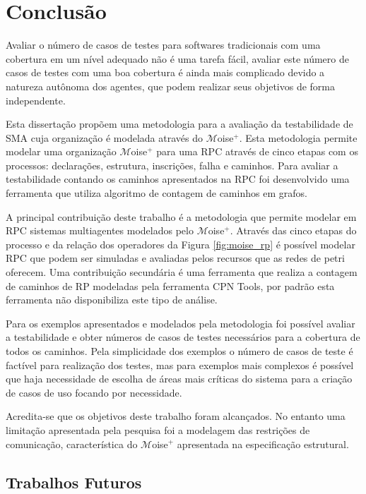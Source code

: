 \chapter{Conclusão}
Avaliar o número de casos de testes para softwares tradicionais com uma cobertura em um nível adequado não é uma tarefa fácil, avaliar este número de casos de testes com uma boa cobertura é ainda mais complicado devido a natureza autônoma dos agentes, que podem realizar seus objetivos de forma independente.

Esta dissertação propõem uma metodologia para a avaliação da testabilidade de SMA cuja organização é modelada através do $\mathcal{M}$oise$^{+}$. Esta metodologia permite modelar uma organização $\mathcal{M}$oise$^{+}$ para uma RPC através de cinco etapas com os processos: declarações, estrutura, inscrições, falha e caminhos. Para avaliar a testabilidade contando os caminhos apresentados na RPC foi desenvolvido uma ferramenta que utiliza algoritmo de contagem de caminhos em grafos.

A principal contribuição deste trabalho é a metodologia que permite modelar em RPC sistemas multiagentes modelados pelo $\mathcal{M}$oise$^{+}$. Através das cinco etapas do processo e da  relação dos operadores da Figura \ref{fig:moise_rp} é possível modelar RPC que podem ser simuladas e avaliadas pelos recursos que as redes de petri oferecem. Uma contribuição secundária é uma ferramenta que realiza a contagem de caminhos de RP modeladas pela ferramenta CPN Tools, por padrão esta ferramenta não disponibiliza este tipo de análise.

Para os exemplos apresentados e modelados pela metodologia foi possível avaliar a testabilidade e obter números de casos de testes necessários para a cobertura de todos os caminhos. Pela simplicidade dos exemplos o número de casos de teste é factível para realização dos testes, mas para exemplos mais complexos é possível que haja necessidade de escolha de áreas mais críticas do sistema para a criação de casos de uso focando por necessidade.

Acredita-se que os objetivos deste trabalho foram alcançados. No entanto uma limitação apresentada pela pesquisa foi a modelagem das restrições de comunicação, característica do  $\mathcal{M}$oise$^{+}$ apresentada na especificação estrutural.

\section{Trabalhos Futuros}

